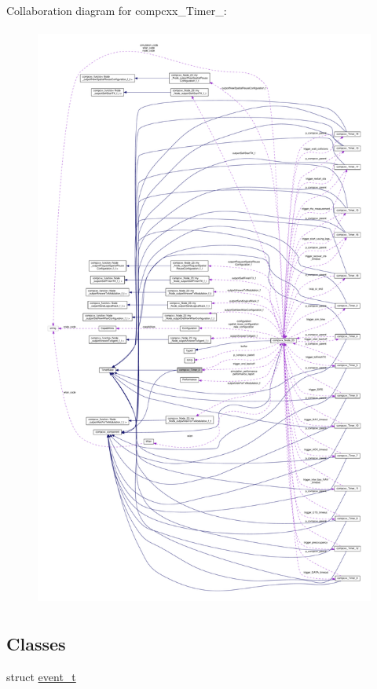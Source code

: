 Collaboration diagram for compcxx\+\_\+\+Timer\+\_\+:\nopagebreak
\begin{figure}[H]
\begin{center}
\leavevmode
\includegraphics[height=550pt]{classcompcxx__Timer__3__coll__graph}
\end{center}
\end{figure}
\subsection*{Classes}
\begin{DoxyCompactItemize}
\item 
struct \hyperlink{structcompcxx__Timer__3_1_1event__t}{event\+\_\+t}
\end{DoxyCompactItemize}
